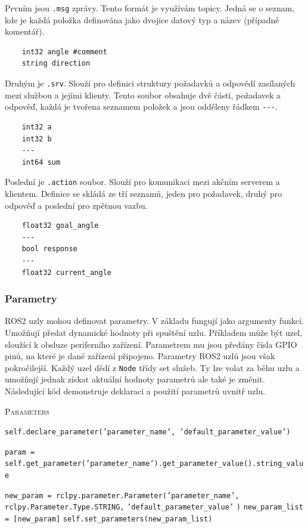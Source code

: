 Prvním jsou \verb|.msg| zprávy. Tento formát je využívám topicy. Jedná se o seznam, kde je každá položka definována jako dvojice datový typ a název (případně komentář).
\begin{verbatim}
	int32 angle #comment
	string direction
\end{verbatim}

Druhým je \verb|.srv|. Slouží pro definici struktury požadavků a odpovědí zasílaných mezi službou a jejími klienty. Tento soubor obsahuje dvě části, požadavek a odpověď, každá je tvořena seznamem položek a jsou odděleny řádkem \verb|---|. 
\begin{verbatim}
	int32 a
	int32 b
	---
	int64 sum
\end{verbatim}

Poslední je \verb|.action| soubor. Slouží pro komunikaci mezi akčním serverem a klientem. Definice se skládá ze tří seznamů, jeden pro požadavek, druhý pro odpověď a poslední pro zpětnou vazbu.
\begin{verbatim}
	float32 goal_angle
	---
	bool response
	---
	float32 current_angle
\end{verbatim}

\subsubsection*{Parametry}
ROS2 uzly mohou definovat parametry. V základu fungují jako argumenty funkcí. Umožňují předat dynamické hodnoty při spuštění uzlu. Příkladem může být uzel, sloužící k obsluze periferního zařízení. Parametrem mu jsou předány čísla GPIO pinů, na které je dané zařízení připojeno. Parametry ROS2 uzlů jsou však pokročilejší. Každý uzel dědí z \verb|Node| třídy set služeb. Ty lze volat za běhu uzlu a umožňují jednak získat aktuální hodnoty parametrů ale také je změnit. Následující kód demonstruje deklaraci a použití parametrů uvnitř uzlu. \cite[str:~37-39]{ros2_introduction}

\begin{algorithm}[h!]
	\label{}
	\caption{\textsc{Parameters}}
	
	\DontPrintSemicolon
	\SetAlgoNoLine
	\SetNlSty{}{}{:}
	\SetNlSkip{-1.1em}
	
	\BlankLine \Indp\Indpp
	
    \texttt{self.declare\_parameter('parameter\_name', 'default\_parameter\_value')}\;
	
	\BlankLine
	\texttt{param = self.get\_parameter('parameter\_name').get\_parameter\_value().string\_value}\;
	
	\BlankLine
	\texttt{new\_param = rclpy.parameter.Parameter('parameter\_name',}\;
	\Indp\Indp
	\texttt{rclpy.Parameter.Type.STRING,}\;
	\texttt{'default\_parameter\_value'}\;
	\Indm\Indm
	\texttt{)}\;
	\texttt{new\_param\_list = [new\_param]}\;
	\texttt{self.set\_parameters(new\_param\_list)}\;

\end{algorithm}

